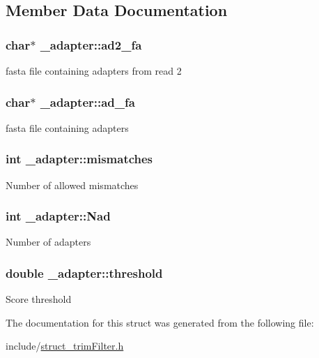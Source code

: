 \subsection{Member Data Documentation}
\hypertarget{struct__adapter_a3e3ff61737be3da0dcab7911ca6ca7c3}{
\subsubsection[{ad2\+\_\+fa}]{\setlength{\rightskip}{0pt plus 5cm}char$\ast$ \+\_\+adapter\+::ad2\+\_\+fa}}\label{struct__adapter_a3e3ff61737be3da0dcab7911ca6ca7c3}
fasta file containing adapters from read 2 \hypertarget{struct__adapter_ad05cb8ebdfbb0728b8069ed17c7d264c}{
\subsubsection[{ad\+\_\+fa}]{\setlength{\rightskip}{0pt plus 5cm}char$\ast$ \+\_\+adapter\+::ad\+\_\+fa}}\label{struct__adapter_ad05cb8ebdfbb0728b8069ed17c7d264c}
fasta file containing adapters \hypertarget{struct__adapter_a51c6998b13837c66f79b3a1dd3c11995}{
\subsubsection[{mismatches}]{\setlength{\rightskip}{0pt plus 5cm}int \+\_\+adapter\+::mismatches}}\label{struct__adapter_a51c6998b13837c66f79b3a1dd3c11995}
Number of allowed mismatches \hypertarget{struct__adapter_aed006c3b66849e781049076b11f297d3}{
\subsubsection[{Nad}]{\setlength{\rightskip}{0pt plus 5cm}int \+\_\+adapter\+::\+Nad}}\label{struct__adapter_aed006c3b66849e781049076b11f297d3}
Number of adapters \hypertarget{struct__adapter_a2d1273cfaa0d51c79f331b92ed2342b4}{
\subsubsection[{threshold}]{\setlength{\rightskip}{0pt plus 5cm}double \+\_\+adapter\+::threshold}}\label{struct__adapter_a2d1273cfaa0d51c79f331b92ed2342b4}
Score threshold 

The documentation for this struct was generated from the following file\+:\begin{DoxyCompactItemize}
\item 
include/\hyperlink{struct__trimFilter_8h}{struct\+\_\+trim\+Filter.\+h}\end{DoxyCompactItemize}
